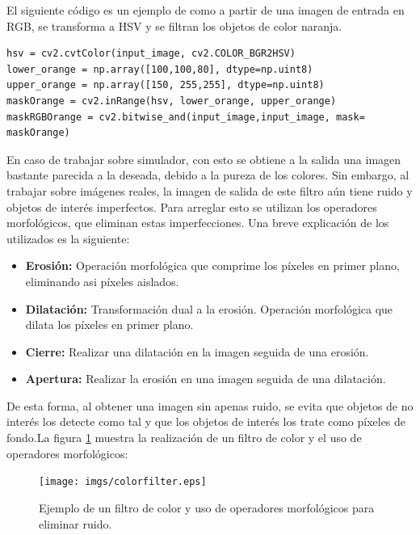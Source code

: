 \hspace{1 cm} El siguiente c\'odigo es un ejemplo de como a partir de una imagen de entrada en RGB, se transforma a HSV y se filtran los objetos de color naranja. 

\begin{lstlisting}[backgroundcolor=\color{yellow}]
hsv = cv2.cvtColor(input_image, cv2.COLOR_BGR2HSV)
lower_orange = np.array([100,100,80], dtype=np.uint8)
upper_orange = np.array([150, 255,255], dtype=np.uint8)
maskOrange = cv2.inRange(hsv, lower_orange, upper_orange)
maskRGBOrange = cv2.bitwise_and(input_image,input_image, mask= maskOrange)
\end{lstlisting}


\hspace{1 cm} En caso de trabajar sobre simulador, con esto se obtiene a la salida una imagen bastante parecida a la deseada, debido a la pureza de los colores. Sin embargo, al trabajar sobre im\'agenes reales, la imagen de salida de este filtro a\'un tiene ruido y objetos de inter\'es imperfectos. Para arreglar esto se utilizan los operadores morfol\'ogicos, que eliminan estas imperfecciones. Una breve explicaci\'on de los utilizados es la siguiente: 

\begin{itemize}
	\item \textbf{Erosi\'on:} Operaci\'on morfol\'ogica que comprime los p\'ixeles en primer plano, eliminando asi p\'ixeles aislados.
	\item \textbf{Dilataci\'on:} Transformaci\'on dual a la erosi\'on. Operaci\'on morfol\'ogica que dilata los p\'ixeles en primer plano.
	\item \textbf{Cierre:} Realizar una dilataci\'on en la imagen seguida de una erosi\'on.
	\item \textbf{Apertura:} Realizar la erosi\'on en una imagen seguida de una dilataci\'on.
\end{itemize}


\hspace{1 cm} De esta forma, al obtener una imagen sin apenas ruido, se evita que objetos de no inter\'es los detecte como tal y que los objetos de inter\'es los trate como p\'ixeles de fondo.La figura \ref{fig:E_Imagen_baliza} muestra la realizaci\'on de un filtro de color y el uso de operadores morfol\'ogicos:

\begin{figure}[ht]
	\centering
		\texttt{[image: imgs/colorfilter.eps]}
         \caption{Ejemplo de un filtro de color y uso de operadores morfol\'ogicos para eliminar ruido.}
	\label{fig:E_Imagen_baliza}
\end{figure}



